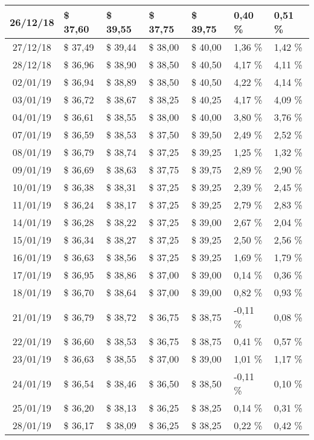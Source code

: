 \begin{center}
\begin{longtable}{|c|p{1.5cm}|p{1.5cm}|p{1.5cm}|p{1.5cm}|p{1.5cm}|p{1.5cm}|}
26/12/18 & \$ 37,60 & \$ 39,55 & \$ 37,75 & \$ 39,75 & 0,40 \% & 0,51 \% \\ \hline
27/12/18 & \$ 37,49 & \$ 39,44 & \$ 38,00 & \$ 40,00 & 1,36 \% & 1,42 \% \\ \hline
28/12/18 & \$ 36,96 & \$ 38,90 & \$ 38,50 & \$ 40,50 & 4,17 \% & 4,11 \% \\ \hline
02/01/19 & \$ 36,94 & \$ 38,89 & \$ 38,50 & \$ 40,50 & 4,22 \% & 4,14 \% \\ \hline
03/01/19 & \$ 36,72 & \$ 38,67 & \$ 38,25 & \$ 40,25 & 4,17 \% & 4,09 \% \\ \hline
04/01/19 & \$ 36,61 & \$ 38,55 & \$ 38,00 & \$ 40,00 & 3,80 \% & 3,76 \% \\ \hline
07/01/19 & \$ 36,59 & \$ 38,53 & \$ 37,50 & \$ 39,50 & 2,49 \% & 2,52 \% \\ \hline
08/01/19 & \$ 36,79 & \$ 38,74 & \$ 37,25 & \$ 39,25 & 1,25 \% & 1,32 \% \\ \hline
09/01/19 & \$ 36,69 & \$ 38,63 & \$ 37,75 & \$ 39,75 & 2,89 \% & 2,90 \% \\ \hline
10/01/19 & \$ 36,38 & \$ 38,31 & \$ 37,25 & \$ 39,25 & 2,39 \% & 2,45 \% \\ \hline
11/01/19 & \$ 36,24 & \$ 38,17 & \$ 37,25 & \$ 39,25 & 2,79 \% & 2,83 \% \\ \hline
14/01/19 & \$ 36,28 & \$ 38,22 & \$ 37,25 & \$ 39,00 & 2,67 \% & 2,04 \% \\ \hline
15/01/19 & \$ 36,34 & \$ 38,27 & \$ 37,25 & \$ 39,25 & 2,50 \% & 2,56 \% \\ \hline
16/01/19 & \$ 36,63 & \$ 38,56 & \$ 37,25 & \$ 39,25 & 1,69 \% & 1,79 \% \\ \hline
17/01/19 & \$ 36,95 & \$ 38,86 & \$ 37,00 & \$ 39,00 & 0,14 \% & 0,36 \% \\ \hline
18/01/19 & \$ 36,70 & \$ 38,64 & \$ 37,00 & \$ 39,00 & 0,82 \% & 0,93 \% \\ \hline
21/01/19 & \$ 36,79 & \$ 38,72 & \$ 36,75 & \$ 38,75 & -0,11 \% & 0,08 \% \\ \hline
22/01/19 & \$ 36,60 & \$ 38,53 & \$ 36,75 & \$ 38,75 & 0,41 \% & 0,57 \% \\ \hline
23/01/19 & \$ 36,63 & \$ 38,55 & \$ 37,00 & \$ 39,00 & 1,01 \% & 1,17 \% \\ \hline
24/01/19 & \$ 36,54 & \$ 38,46 & \$ 36,50 & \$ 38,50 & -0,11 \% & 0,10 \% \\ \hline
25/01/19 & \$ 36,20 & \$ 38,13 & \$ 36,25 & \$ 38,25 & 0,14 \% & 0,31 \% \\ \hline
28/01/19 & \$ 36,17 & \$ 38,09 & \$ 36,25 & \$ 38,25 & 0,22 \% & 0,42 \% \\ \hline

\end{longtable}
\end{center}
